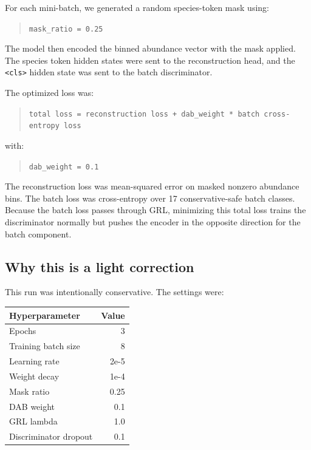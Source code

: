 \documentclass[11pt]{article}
\newcommand{\code}[1]{\texttt{\small #1}}
\begin{document}
For each mini-batch, we generated a random species-token mask using:

\begin{quote}
\code{mask\_ratio = 0.25}
\end{quote}

The model then encoded the binned abundance vector with the mask applied. The species
token hidden states were sent to the reconstruction head, and the \code{<cls>} hidden
state was sent to the batch discriminator.

The optimized loss was:

\begin{quote}
\code{total loss = reconstruction loss + dab\_weight * batch cross-entropy loss}
\end{quote}

with:

\begin{quote}
\code{dab\_weight = 0.1}
\end{quote}

The reconstruction loss was mean-squared error on masked nonzero abundance bins. The
batch loss was cross-entropy over 17 conservative-safe batch classes. Because the batch
loss passes through GRL, minimizing this total loss trains the discriminator normally but
pushes the encoder in the opposite direction for the batch component.

\subsection{Why this is a light correction}

This run was intentionally conservative. The settings were:

\begin{center}
\begin{tabular}{lr}
\toprule
Hyperparameter & Value \\
\midrule
Epochs & 3 \\
Training batch size & 8 \\
Learning rate & 2e-5 \\
Weight decay & 1e-4 \\
Mask ratio & 0.25 \\
DAB weight & 0.1 \\
GRL lambda & 1.0 \\
Discriminator dropout & 0.1 \\
\bottomrule
\end{tabular}
\end{center}
\end{document}
